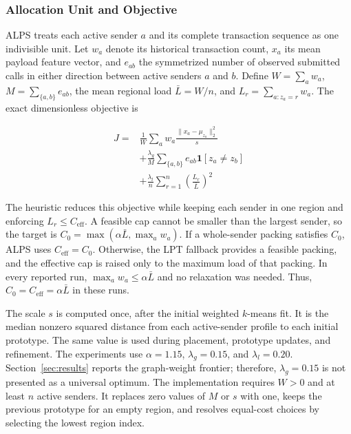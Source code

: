 \documentclass[conference,letterpaper]{IEEEtran}
\begin{document}
\subsubsection{Allocation Unit and Objective}

ALPS treats each active sender $a$ and its complete transaction sequence as one
indivisible unit. Let $w_a$ denote its historical transaction count, $x_a$ its
mean payload feature vector, and $e_{ab}$ the symmetrized number of observed
submitted calls in either direction between active senders $a$ and $b$. Define $W=\sum_a w_a$,
$M=\sum_{\{a,b\}}e_{ab}$, the mean regional load $\bar L=W/n$, and
$L_r=\sum_{a:z_a=r}w_a$. The exact dimensionless objective is

\begin{equation}
\label{eq:objective}
\begin{aligned}
J={}&\frac{1}{W}\sum_a w_a
 \frac{\lVert x_a-\mu_{z_a}\rVert_2^2}{s}\\
 &+\frac{\lambda_g}{M}\sum_{\{a,b\}}e_{ab}\mathbf{1}[z_a\ne z_b]\\
 &+\frac{\lambda_l}{n}\sum_{r=1}^{n}\left(\frac{L_r}{\bar L}\right)^2
\end{aligned}
\end{equation}

The heuristic reduces this objective while keeping each sender in one region
and enforcing $L_r\leq C_{\mathrm{eff}}$. A feasible cap cannot be smaller than
the largest sender, so the target is
$C_0=\max(\alpha\bar L,\max_a w_a)$. If a whole-sender packing satisfies
$C_0$, ALPS uses $C_{\mathrm{eff}}=C_0$. Otherwise, the LPT fallback provides
a feasible packing, and the effective cap is raised only to the maximum load
of that packing. In every reported run, $\max_a w_a\leq\alpha\bar L$ and no
relaxation was needed. Thus, $C_0=C_{\mathrm{eff}}=\alpha\bar L$ in these runs.

The scale $s$ is computed once, after the initial weighted $k$-means fit. It is
the median nonzero squared distance from each active-sender profile to each
initial prototype. The same value is used during placement, prototype updates,
and refinement. The experiments use $\alpha=1.15$, $\lambda_g=0.15$, and
$\lambda_l=0.20$. Section~\ref{sec:results} reports the graph-weight frontier;
therefore, $\lambda_g=0.15$ is not presented as a universal optimum. The
implementation requires $W>0$ and at least $n$ active senders. It replaces
zero values of $M$ or $s$ with one, keeps the previous prototype for an empty
region, and resolves equal-cost choices by selecting the lowest region index.
\end{document}
